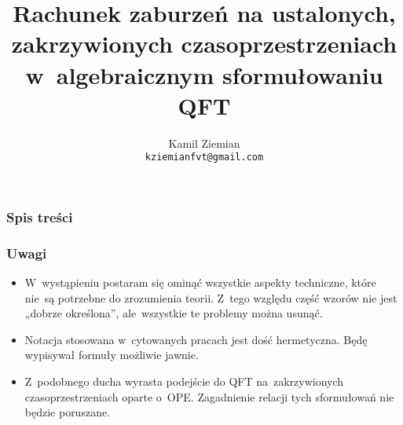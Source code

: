\documentclass[10pt,t]{beamer}
\title{Rachunek zaburzeń na ustalonych, zakrzywionych czasoprzestrzeniach
  w~algebraicznym sformułowaniu QFT} %
\author{Kamil Ziemian \\
  \texttt{kziemianfvt@gmail.com}}
\begin{document}






\RaggedRight





\maketitle %



\begin{frame}
  \frametitle{Spis treści}


  \tableofcontents %

\end{frame}





\begin{frame}
  \frametitle{Uwagi}


  \begin{itemize}
    \RaggedRight

  \item W~wystąpieniu postaram się ominąć wszystkie aspekty
    techniczne, które nie~są potrzebne do zrozumienia teorii. Z~tego
    względu część wzorów nie jest „dobrze określona”,
    ale~wszystkie te problemy można usunąć.

  \item Notacja stosowana w~cytowanych pracach jest dość
    hermetyczna. Będę wypisywał formuły możliwie jawnie.

  \item Z~podobnego ducha wyrasta podejście do QFT
    na~zakrzywionych czasoprzestrzeniach oparte o~OPE.
    Zagadnienie relacji tych sformułowań nie będzie poruszane.

  \end{itemize}

\end{frame}
\end{document}
